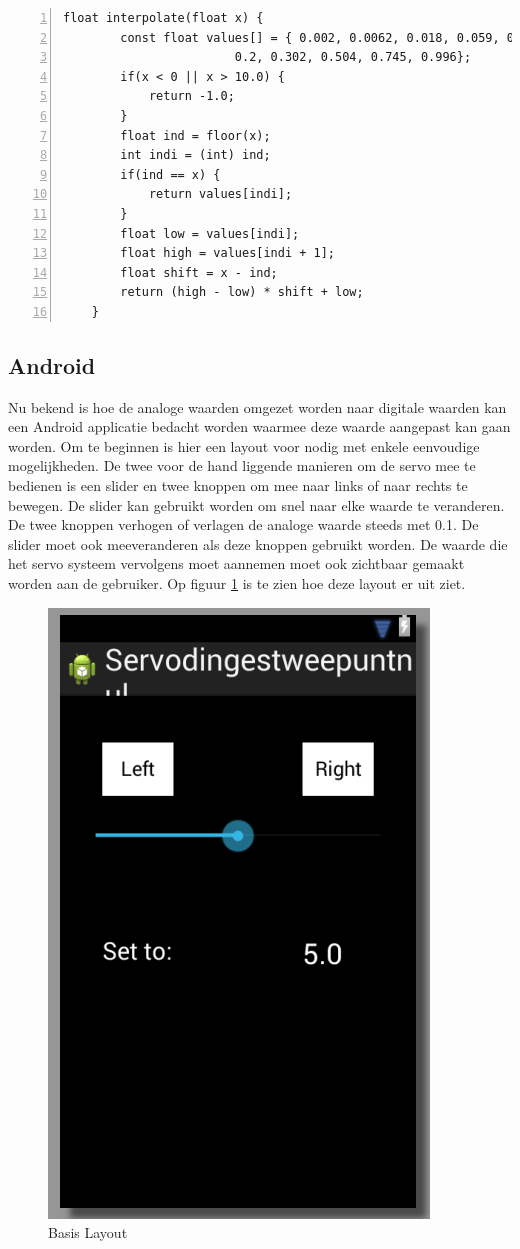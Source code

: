\documentclass[a4paper]{article}
\begin{document}
	\newpage
	\begin{lstlisting}[caption=Linear Interpolation, label=lst:interpolate, numbers=left]
	float interpolate(float x) {
		const float values[] = { 0.002, 0.0062, 0.018, 0.059, 0.105, 0.152,
					    0.2, 0.302, 0.504, 0.745, 0.996};
		if(x < 0 || x > 10.0) {
			return -1.0;
		}
		float ind = floor(x);
		int indi = (int) ind;
		if(ind == x) {
			return values[indi];
		}
		float low = values[indi];
		float high = values[indi + 1];
		float shift = x - ind;
		return (high - low) * shift + low;
	}
	\end{lstlisting}
		\subsection{Android}
		Nu bekend is hoe de analoge waarden omgezet worden naar digitale waarden kan een Android applicatie bedacht worden waarmee deze waarde aangepast kan gaan worden. Om te beginnen is hier een layout voor nodig met enkele eenvoudige mogelijkheden. De twee voor de hand liggende manieren om de servo mee te bedienen is een slider en twee knoppen om mee naar links of naar rechts te bewegen. De slider kan gebruikt worden om snel naar elke waarde te veranderen. De twee knoppen verhogen of verlagen de analoge waarde steeds met 0.1. De slider moet ook meeveranderen als deze knoppen gebruikt worden. De waarde die het servo systeem vervolgens moet aannemen moet ook zichtbaar gemaakt worden aan de gebruiker. Op figuur \ref{fig:layout1} is te zien hoe deze layout er uit ziet.
	\begin{figure}[h]
		\centering
		\includegraphics[scale=0.6]{imgs/layout1.png}
		\caption{Basis Layout}
		\label{fig:layout1}
	\end{figure}
\end{document}
